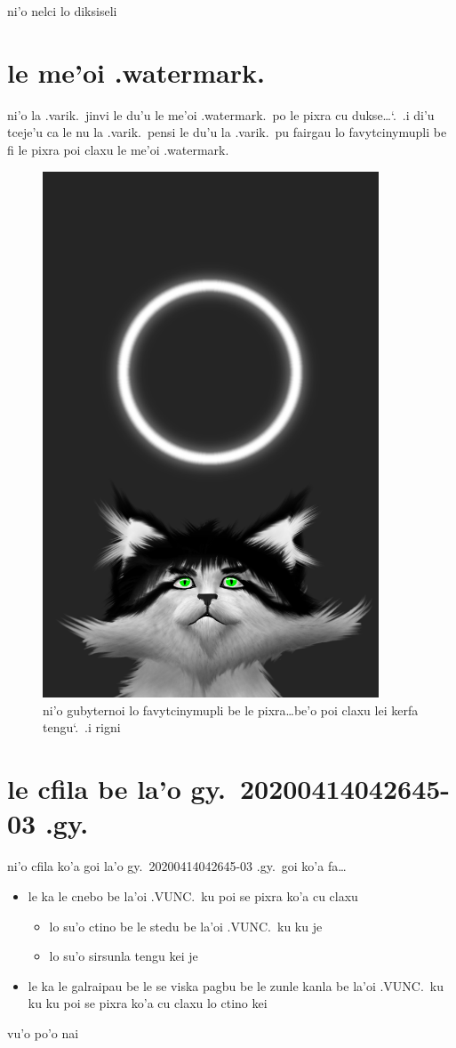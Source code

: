 \documentclass{report}
\newcommand\sds{\spacefactor\sfcode`.\ \space}
\begin{document}
ni'o nelci lo diksiseli

\section{le me'oi .watermark.}
ni'o la .varik.\ jinvi le du'u le me'oi .watermark.\ po le pixra cu dukse\ldots\sds .i di'u tceje'u ca le nu la .varik.\ pensi le du'u la .varik.\ pu fairgau lo favytcinymupli be fi le pixra poi claxu le me'oi .watermark.

\begin{figure}[ht]
	\centering
	\includegraphics[width=10cm]{20200414042645-03/20200414042645-03-uw.png}
	\caption[center]{ni'o gubyternoi lo favytcinymupli be le pixra\ldots be'o poi claxu lei kerfa tengu\sds  .i rigni}
\end{figure}

\section{le cfila be la'o gy.\ 20200414042645-03 .gy.}
ni'o cfila ko'a goi la'o gy.\ 20200414042645-03 .gy.\ goi ko'a fa\ldots
\begin{itemize}
	\item le ka le cnebo be la'oi .VUNC.\ ku poi se pixra ko'a cu claxu
	\begin{itemize}
		\item lo su'o ctino be le stedu be la'oi .VUNC.\ ku ku je
		\item lo su'o sirsunla tengu kei je
	\end{itemize}
	\item le ka le galraipau be le se viska pagbu be le zunle kanla be la'oi .VUNC.\ ku ku ku poi se pixra ko'a cu claxu lo ctino kei
\end{itemize}
vu'o po'o nai
\end{document}
